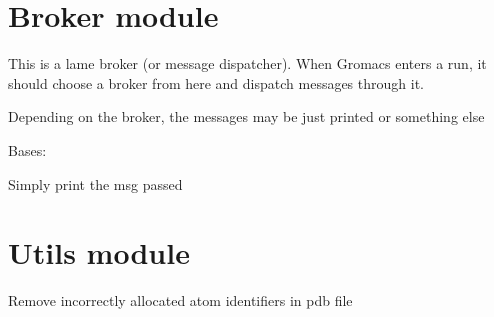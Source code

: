 \documentclass[letterpaper,10pt,english]{sphinxmanual}
\begin{document}
\sphinxstepscope


\section{Broker module}
\label{\detokenize{broker:module-broker}}\label{\detokenize{broker:broker-module}}\label{\detokenize{broker::doc}}
\sphinxAtStartPar
This is a lame broker (or message dispatcher). When Gromacs enters a run, 
it should choose a broker from here and dispatch messages through it.

\sphinxAtStartPar
Depending on the broker, the messages may be just printed or something else

\begin{fulllineitems}
\label{\detokenize{broker:broker.Printing}}
\pysigstartsignatures
{}
\pysigstopsignatures
\sphinxAtStartPar
Bases: 

\begin{fulllineitems}
\label{\detokenize{broker:broker.Printing.dispatch}}
\pysigstartsignatures
{}
\pysigstopsignatures
\sphinxAtStartPar
Simply print the msg passed

\end{fulllineitems}


\end{fulllineitems}


\sphinxstepscope


\section{Utils module}
\label{\detokenize{utils:module-utils}}\label{\detokenize{utils:utils-module}}\label{\detokenize{utils::doc}}

\begin{fulllineitems}
\label{\detokenize{utils:utils.clean_pdb}}
\pysigstartsignatures
{}
\pysigstopsignatures
\sphinxAtStartPar
Remove incorrectly allocated atom identifiers in pdb file

\end{fulllineitems}
\end{document}
